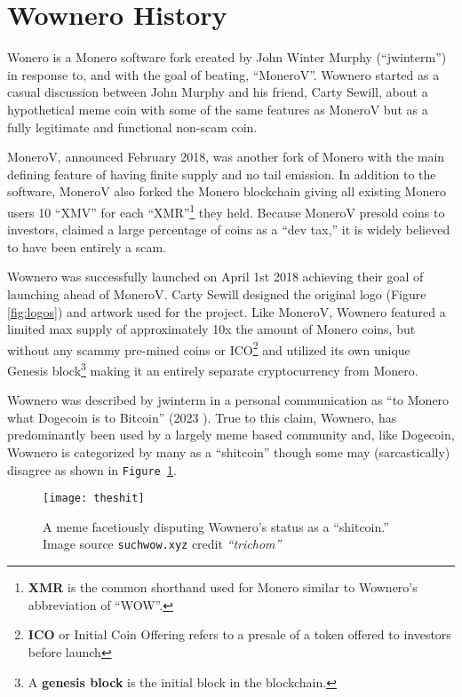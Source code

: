 \section{Wownero History}
Wonero is a Monero software fork created by John Winter Murphy (``jwinterm'')\cite{wowdere_dev} in response to, and with the goal of beating, ``MoneroV''\cite{jwinterview}. Wownero started as a casual discussion between John Murphy and his friend, Carty Sewill, about a hypothetical meme coin with some of the same features as MoneroV but as a fully legitimate and functional non-scam coin\cite{jwinterview}.

MoneroV, announced February 2018, was another fork of Monero with the main defining feature of having finite supply and no tail emission\cite{monerov}. In addition to the software, MoneroV also forked the Monero blockchain giving all existing Monero users 10 ``XMV'' for each ``XMR''\footnote{\textbf{XMR} is the common shorthand used for Monero similar to Wownero's abbreviation of ``WOW''.} they held.
Because MoneroV presold coins to investors, claimed a large percentage of coins as a ``dev tax,'' it is widely believed to have been entirely a scam\cite{monerov_scam,monerov}. 


Wownero was successfully launched on April 1st 2018 achieving their goal of launching ahead of MoneroV\cite{jwinterview}. Carty Sewill designed the original logo (Figure \ref{fig:logos}) and artwork used for the project\cite{jwinterview}. Like MoneroV, Wownero featured a limited max supply of approximately 10x the amount of Monero coins, but without any scammy pre-mined coins or ICO\footnote{\textbf{ICO} or Initial Coin Offering refers to a presale of a token offered to investors before launch} and utilized its own unique Genesis block\footnote{A \textbf{genesis block} is the initial block in the blockchain.} making it an entirely separate cryptocurrency from Monero.

Wownero was described by jwinterm in a personal communication as ``to Monero what Dogecoin is to Bitcoin'' (2023 \cite{jwinterview}). True to this claim, Wownero, has predominantly been used by a largely meme based community and, like Dogecoin, Wownero is categorized by many as a ``shitcoin'' though some may (sarcastically) disagree as shown in \texttt{Figure \ref{fig:theshitmeme}}.

\begin{figure}[h]
    \centering
    \texttt{[image: theshit]}
    \caption{
        A meme facetiously disputing Wownero's status as a ``shitcoin.''\\
        Image source \texttt{suchwow.xyz} credit \emph{``trichom''}
    }
    \label{fig:theshitmeme}
\end{figure}

